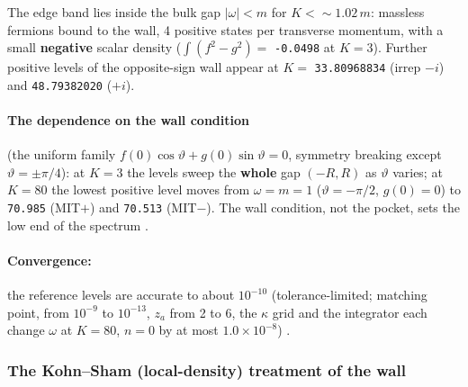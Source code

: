 The edge band lies inside the bulk gap $|\omega|<m$ for $K<{\sim}1.02\,m$: massless fermions bound to the
wall, 4 positive states per transverse momentum, with a small \textbf{negative} scalar density
($\int(f^2-g^2)=$ \texttt{-0.0498} at $K=3$). Further positive levels of the
opposite-sign wall appear at $K=$ \texttt{33.80968834}  (irrep $-i$) and
\texttt{48.79382020}  ($+i$).

\paragraph{The dependence on the wall condition} (the uniform family
$f(0)\cos\vartheta+g(0)\sin\vartheta=0$, symmetry breaking except $\vartheta=\pm\pi/4$): at $K=3$ the levels
sweep the \textbf{whole} gap $(-R,R)$ as $\vartheta$ varies; at $K=80$ the lowest positive level moves from
$\omega=m=1$  ($\vartheta=-\pi/2$, $g(0)=0$) to \texttt{70.985} 
(MIT$+$) and \texttt{70.513}  (MIT$-$). The wall condition, not the pocket, sets the low
end of the spectrum .

\paragraph{Convergence:} the reference levels are accurate to about $10^{-10}$ (tolerance-limited; matching
point,  from $10^{-9}$ to $10^{-13}$, $z_a$ from 2 to 6, the $\kappa$ grid and the integrator
each change $\omega$ at $K=80$, $n=0$ by at most $1.0\times10^{-8}$) .

\subsubsection[{The Kohn--Sham (local-density) treatment of the wall [WG 6]}]{The Kohn--Sham (local-density) treatment of the wall }
\label{sec:4.6.6}

